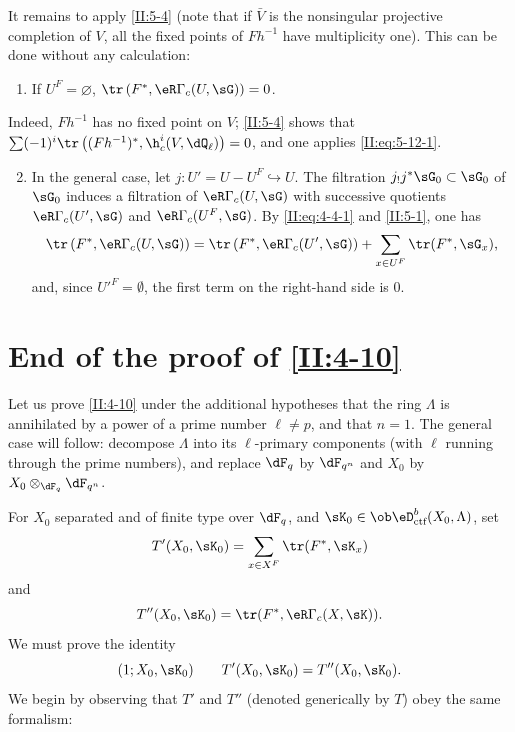 It remains to apply \ref{II:5-4} (note that if $\bar V$ is the nonsingular
projective completion of $V$, all the fixed points of $F h^{-1}$ have
multiplicity one). This can be done without any calculation:
\begin{enumerate}[\indent A.]
  \item If $U^F=\varnothing$,
    $\tr\left(F^*,\eR\Gamma_c(U,\sG)\right) = 0$. \end{enumerate}

Indeed, $F h^{-1}$ has no fixed point on $V$; \ref{II:5-4} shows that
$\sum (-1)^i \tr\left((F h^{-1})^*,\h_c^i(V,\dQ_\ell)\right)=0$, and one
applies \eqref{II:eq:5-12-1}.
\begin{enumerate}[\indent A.]
\setcounter{enumi}{1}
  \item {}In the general case, let $j:U'=U-U^F\hookrightarrow U$.
    The filtration $j_! j^* \sG_0\subset \sG_0$ of $\sG_0$ induces a
    filtration of $\eR\Gamma_c(U,\sG)$ with successive quotients
    $\eR\Gamma_c(U',\sG)$ and $\eR\Gamma_c(U^F,\sG)$. By
    \eqref{II:eq:4-4-1} and \ref{II:5-1}, one has
    \[
      \tr\left(F^*,\eR\Gamma_c(U,\sG)\right) = \tr\left(F^*,\eR\Gamma_c(U',\sG)\right) + \sum_{x\in U^F} \tr(F^*,\sG_x) \text{,}
    \]
    and, since ${U'}^F=\emptyset$, the first term on the right-hand side is $0$.
\end{enumerate}











\section{End of the proof of \ref{II:4-10}}\label{II:6}

Let us prove \ref{II:4-10} under the additional hypotheses that the ring
$\Lambda$ is annihilated by a power of a prime number $\ell\ne p$, and that
$n=1$. The general case will follow: decompose $\Lambda$ into its
$\ell$-primary components (with $\ell$ running through the prime numbers),
and replace $\dF_q$ by $\dF_{q^n}$ and $X_0$ by
$X_0\otimes_{\dF_q}\dF_{q^n}$.

For $X_0$ separated and of finite type over $\dF_q$, and
$\sK_0\in\ob\eD_\text{ctf}^b(X_0,\Lambda)$, set
\[
  T'(X_0,\sK_0) = \sum_{x\in X^F} \tr(F^*,\sK_x)
\]
and
\[
  T''(X_0,\sK_0) = \tr(F^*,\eR\Gamma_c(X,\sK)) \text{.}
\]
We must prove the identity
\[
  (1;X_0,\sK_0) \qquad T'(X_0,\sK_0) = T''(X_0,\sK_0) \text{.}
\]
We begin by observing that $T'$ and $T''$ (denoted generically by $T$) obey
the same formalism:

